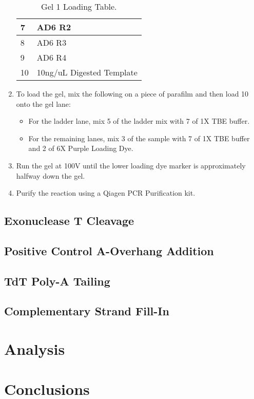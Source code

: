 \documentclass{ssiBio}
\begin{document}
\begin{enumerate}
\begin{table}[ht]
\begin{tabular}{|l|l|}
    7 & AD6 R2 \\ \hline
    8 & AD6 R3 \\ \hline
    9 & AD6 R4 \\ \hline
    10 & 10ng/uL Digested Template \\ \hline
    \end{tabular}
    \caption{\label{tab:gel-1-table}Gel 1 Loading Table.}
    \end{table}
  \item{To load the gel, mix the following on a piece of parafilm and then load 10\uL{} onto the gel lane:}
  \begin{itemize}
    \item{For the ladder lane, mix 5\uL{} of the ladder mix with 7\uL{} of 1X TBE buffer.}
    \item{For the remaining lanes, mix 3\uL{} of the sample with 7\uL{} of 1X TBE buffer and 2\uL{} of 6X Purple Loading Dye.}
  \end{itemize}
  \item{Run the gel at 100V until the lower loading dye marker is approximately halfway down the gel.}
  \item{Purify the reaction using a Qiagen PCR Purification kit.}
  \stopPoint{}
\end{enumerate}

\subsection{Exonuclease T Cleavage}

\subsection{Positive Control A-Overhang Addition}

\subsection{TdT Poly-A Tailing}

\subsection{Complementary Strand Fill-In}

\section{Analysis}

\section{Conclusions}



\end{document}
